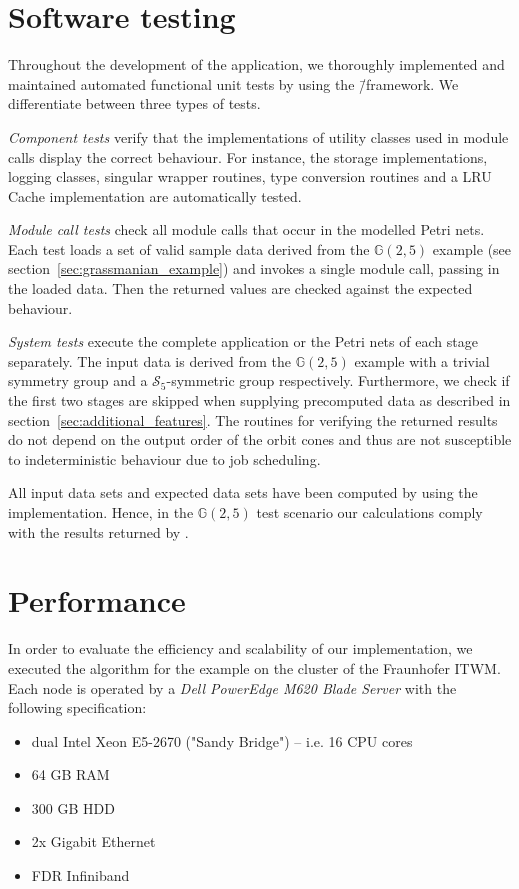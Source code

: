 \section{Software testing}

Throughout the development of the application, we thoroughly implemented and maintained automated functional unit tests by using the \gtest{}\=/framework. We differentiate between three types of tests.

\emph{Component tests} verify that the implementations of utility classes used in module calls display the correct behaviour. For instance, the storage implementations, logging classes, singular wrapper routines, type conversion routines and a LRU Cache implementation are automatically tested.

\emph{Module call tests} check all module calls that occur in the modelled Petri nets. 
Each test loads a set of valid sample data derived from the $\mathbb{G}(2,5)$ example (see section~\ref{sec:grassmanian_example}) and invokes a single module call, passing in the loaded data. Then the returned values are checked against the expected behaviour.

\emph{System tests} execute the complete application or the Petri nets of each stage separately. The input data is derived from the $\mathbb{G}(2,5)$ example with a trivial symmetry group and a $\mathcal{S}_5$-symmetric group respectively. Furthermore, we check if the first two stages are skipped when supplying precomputed data as described in section~\ref{sec:additional_features}. The routines for verifying the returned results do not depend on the output order of the orbit cones and thus are not susceptible to indeterministic behaviour due to job scheduling.

All input data sets and expected data sets have been computed by using the \gitfanlib{} implementation. Hence, in the $\mathbb{G}(2,5)$ test scenario our calculations comply with the results returned by \gitfanlib{}.

\section{Performance}

In order to evaluate the efficiency and scalability of our implementation, we executed the algorithm for the \msix{} example on the cluster of the \ac{Fraunhofer ITWM}. Each node is operated by a \emph{Dell PowerEdge M620 Blade Server} with the following specification:
\begin{itemize}
	\item dual Intel Xeon E5-2670 ("Sandy Bridge") -- i.e. 16 CPU cores
	\item 64 GB RAM
	\item 300 GB HDD
	\item 2x Gigabit Ethernet
	\item FDR Infiniband
\end{itemize}

